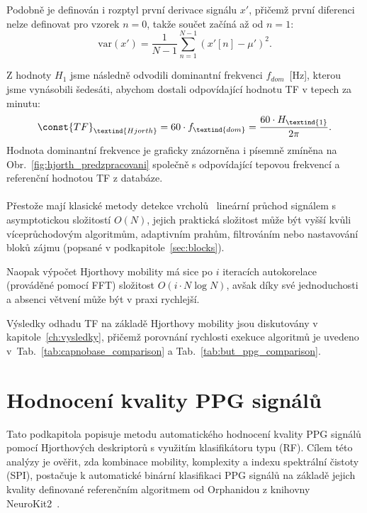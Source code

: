 Podobně je definován i rozptyl první derivace signálu \( x' \), přičemž první diferenci nelze definovat pro vzorek \( n = 0 \), takže součet začíná až od \( n = 1 \):
\begin{equation}
	\label{eq:hjorth_var_signal_diff}
	\mathrm{var}(x') = \frac{1}{N - 1} \sum_{n=1}^{N-1} (x'[n] - \mu')^2.
\end{equation}

Z hodnoty \( H_1 \) jsme následně odvodili dominantní frekvenci \( f_{dom} \)~[Hz], kterou jsme vynásobili šedesáti, abychom dostali odpovídající hodnotu \acs{TF} v tepech za minutu:
\begin{equation}
	\const{TF}_{\textind{Hjorth}} = 60 \cdot f_{\textind{dom}} = \frac{60 \cdot H_{\textind{1}}}{2\pi}.
\end{equation}
Hodnota dominantní frekvence je graficky znázorněna i písemně zmíněna na Obr.~\ref{fig:hjorth_predzpracovani} společně s odpovídající tepovou frekvencí a referenční hodnotou \acs{TF} z databáze.

\paragraph{}
Přestože mají klasické metody detekce vrcholů~\cite{Elgendi2013} lineární průchod signálem s asymptotickou složitostí \( O(N) \), jejich praktická složitost může být vyšší kvůli víceprůchodovým algoritmům, adaptivním prahům, filtrováním nebo nastavování bloků zájmu (popsané v podkapitole~\ref{sec:blocks}).

Naopak výpočet Hjorthovy mobility má sice po \( i \) iteracích autokorelace (prováděné pomocí \acs{FFT}) složitost \( O(i \cdot N \log N) \), avšak díky své jednoduchosti a absenci větvení může být v praxi rychlejší.

Výsledky odhadu \acs{TF} na základě Hjorthovy mobility jsou diskutovány v kapitole~\ref{ch:vysledky}, přičemž porovnání rychlosti exekuce algoritmů je uvedeno v~Tab.~\ref{tab:capnobase_comparison} a Tab.~\ref{tab:but_ppg_comparison}.

\section{Hodnocení kvality PPG signálů}
\label{sec:hjorth_kvalita}
Tato podkapitola popisuje metodu automatického hodnocení kvality \acs{PPG} signálů pomocí Hjorthových deskriptorů s využitím klasifikátoru typu  (\acs{RF}).
Cílem této analýzy je ověřit, zda kombinace mobility, komplexity a indexu spektrální čistoty (\acs{SPI}), postačuje k automatické binární klasifikaci \acs{PPG} signálů na základě jejich kvality definované referenčním algoritmem od Orphanidou z knihovny NeuroKit2~\cite{NeuroKit2}.

